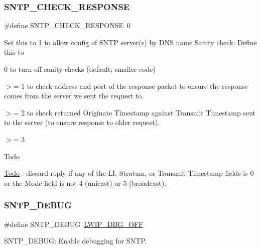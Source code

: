 \subsubsection{\texorpdfstring{S\+N\+T\+P\+\_\+\+C\+H\+E\+C\+K\+\_\+\+R\+E\+S\+P\+O\+N\+SE}{SNTP\_CHECK\_RESPONSE}\hspace{0.1cm}{\footnotesize\ttfamily [2/2]}}
{\footnotesize\ttfamily \#define S\+N\+T\+P\+\_\+\+C\+H\+E\+C\+K\+\_\+\+R\+E\+S\+P\+O\+N\+SE~0}

Set this to 1 to allow config of S\+N\+TP server(s) by D\+NS name Sanity check\+: Define this to
\begin{DoxyItemize}
\item 0 to turn off sanity checks (default; smaller code)
\item $>$= 1 to check address and port of the response packet to ensure the response comes from the server we sent the request to.
\item $>$= 2 to check returned Originate Timestamp against Transmit Timestamp sent to the server (to ensure response to older request).
\item $>$= 3\begin{DoxyRefDesc}{Todo}
\item[\hyperlink{todo__todo000021}{Todo}]\+: discard reply if any of the LI, Stratum, or Transmit Timestamp fields is 0 or the Mode field is not 4 (unicast) or 5 (broadcast).\end{DoxyRefDesc}

\end{DoxyItemize}\mbox{\label{group__sntp__opts_ga25c6f9c14c17e218d110d826b09f8d91}} 
\subsubsection{\texorpdfstring{S\+N\+T\+P\+\_\+\+D\+E\+B\+UG}{SNTP\_DEBUG}\hspace{0.1cm}{\footnotesize\ttfamily [1/2]}}
{\footnotesize\ttfamily \#define S\+N\+T\+P\+\_\+\+D\+E\+B\+UG~\hyperlink{group__debugging__levels_gadab1cdc3f45939a3a5c9a3d7e04987e1}{L\+W\+I\+P\+\_\+\+D\+B\+G\+\_\+\+O\+FF}}

S\+N\+T\+P\+\_\+\+D\+E\+B\+UG\+: Enable debugging for S\+N\+TP. \mbox{\label{group__sntp__opts_ga25c6f9c14c17e218d110d826b09f8d91}} 
